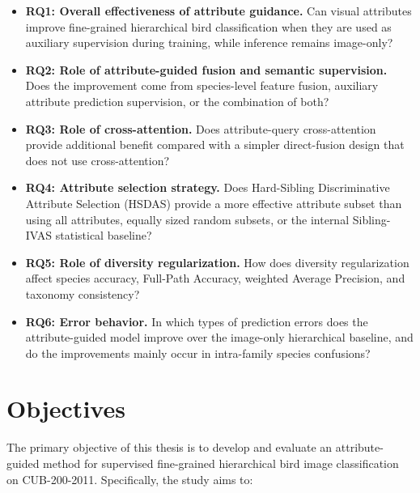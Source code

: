 \begin{itemize}
    \item \textbf{RQ1: Overall effectiveness of attribute guidance.}
    Can visual attributes improve fine-grained hierarchical bird classification when they are used as auxiliary supervision during training, while inference remains image-only?

    \item \textbf{RQ2: Role of attribute-guided fusion and semantic supervision.}
    Does the improvement come from species-level feature fusion, auxiliary attribute prediction supervision, or the combination of both?

    \item \textbf{RQ3: Role of cross-attention.}
    Does attribute-query cross-attention provide additional benefit compared with a simpler direct-fusion design that does not use cross-attention?

    \item \textbf{RQ4: Attribute selection strategy.}
    Does Hard-Sibling Discriminative Attribute Selection (HSDAS) provide a more effective attribute subset than using all attributes, equally sized random subsets, or the internal Sibling-IVAS statistical baseline?

    \item \textbf{RQ5: Role of diversity regularization.}
    How does diversity regularization affect species accuracy, Full-Path Accuracy, weighted Average Precision, and taxonomy consistency?

    \item \textbf{RQ6: Error behavior.}
    In which types of prediction errors does the attribute-guided model improve over the image-only hierarchical baseline, and do the improvements mainly occur in intra-family species confusions?
\end{itemize}





\section{Objectives}

The primary objective of this thesis is to develop and evaluate an attribute-guided method for supervised fine-grained hierarchical bird image classification on CUB-200-2011. Specifically, the study aims to:


